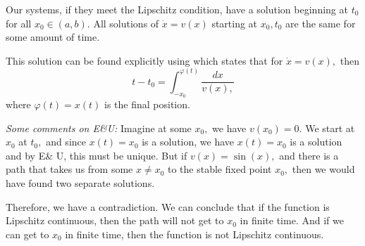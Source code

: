 \documentclass{article}
\numberwithin{equation}{section}
\begin{document}
Our systems, if they meet the Lipschitz condition, have a solution beginning at $t_0$ for all $x_0 \in (a,b).$ All solutions of $\dot{x} = v(x)$ starting at $x_0,t_0$ are the same for some amount of time.

This solution can be found explicitly using  which states that for $\dot{x} = v(x),$ then 
\begin{equation*}
    t-t_0 = \int_{-x_0}^{\varphi(t)} \frac{dx}{v(x),}
\end{equation*}
where $\varphi(t)=x(t)$ is the final position.

\textit{Some comments on E\&U:} Imagine at some $x_0,$ we have $v(x_0)=0.$ We start at $x_0$ at $t_0,$ and since $x(t)=x_0$ is a solution, we have $x(t) = x_0$ is a solution and by E\& U, this must be unique. But if $v(x)=\sin(x),$ and there is a path that takes us from some $x\neq x_0$ to the stable fixed point $x_0,$ then we would have found two separate solutions.

Therefore, we have a contradiction. We can conclude that if the function is Lipschitz continuous, then the path will not get to $x_0$ in finite time. And if we can get to $x_0$ in finite time, then the function is not Lipschitz continuous.
\end{document}
